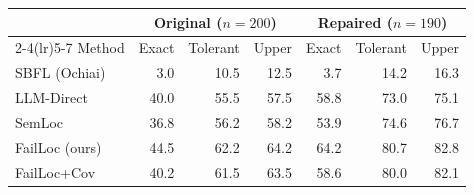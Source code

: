 \begin{tabular}{lrrrrrr}
\toprule
 & \multicolumn{3}{c}{Original ($n=200$)} & \multicolumn{3}{c}{Repaired ($n=190$)} \\
\cmidrule(lr){2-4}\cmidrule(lr){5-7}
Method & Exact & Tolerant & Upper & Exact & Tolerant & Upper \\
\midrule
SBFL (Ochiai) & 3.0 & 10.5 & 12.5 & 3.7 & 14.2 & 16.3 \\
LLM-Direct & 40.0 & 55.5 & 57.5 & 58.8 & 73.0 & 75.1 \\
SemLoc & 36.8 & 56.2 & 58.2 & 53.9 & 74.6 & 76.7 \\
FailLoc (ours) & 44.5 & 62.2 & 64.2 & 64.2 & 80.7 & 82.8 \\
FailLoc+Cov & 40.2 & 61.5 & 63.5 & 58.6 & 80.0 & 82.1 \\
\bottomrule
\end{tabular}
